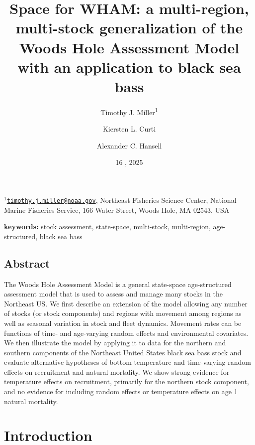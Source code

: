 \documentclass[
]{article}
\title{Space for WHAM: a multi-region, multi-stock generalization of the Woods Hole Assessment Model with an application to black sea bass}
\author{Timothy J. Miller\textsuperscript{1} \and Kiersten L. Curti \and Alexander C. Hansell}
\date{16 \DIFdelbegin \DIFdel{May}\DIFdelend \DIFaddbegin \DIFadd{June}\DIFaddend , 2025}
\begin{document}
\maketitle

\(^1\)\href{mailto:timothy.j.miller@noaa.gov}{\nolinkurl{timothy.j.miller@noaa.gov}}, Northeast Fisheries Science Center, National Marine Fisheries Service, 166 Water Street, Woods Hole, MA 02543, USA\\

\pagebreak

\textbf{keywords:} stock assessment, state-space, multi-stock, multi-region, age-structured, black sea bass

\hypertarget{abstract}{%
\subsection*{Abstract}\label{abstract}}

The Woods Hole Assessment Model is a general state-space age-structured assessment model that is used to assess and manage many stocks in the Northeast US. We first describe an extension of the model allowing any number of stocks (or stock components) and regions with movement among regions as well as seasonal variation in stock and fleet dynamics. Movement rates can be functions of time- and age-varying random effects and environmental covariates. We then illustrate the model by applying it to data for the northern and southern components of the Northeast United States black sea bass stock and evaluate alternative hypotheses of bottom temperature and time-varying random effects on recruitment and natural mortality. We show strong evidence for temperature effects on recruitment, primarily for the northern stock component, and no evidence for including random effects or temperature effects on age 1 natural mortality.

\pagebreak

\hypertarget{introduction}{%
\section*{Introduction}\label{introduction}}
\end{document}
